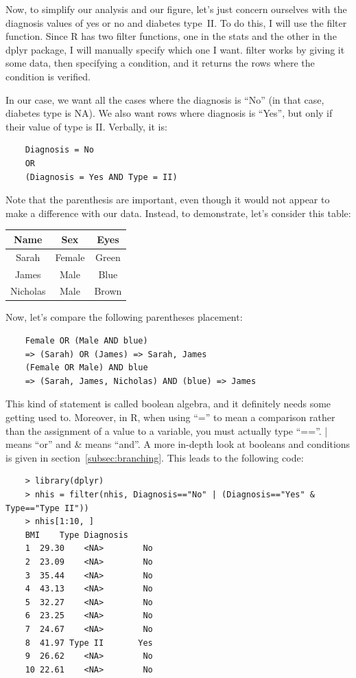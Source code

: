 \documentclass{report}
\newcommand{\code}[1]{\textsf{\ttfamily #1}}
\begin{document}
	Now, to simplify our analysis and our figure, let's just concern ourselves with the diagnosis values of yes or no and diabetes type~II. To do this, I will use the \code{filter} function. Since R has two \code{filter} functions, one in the \code{stats} and the other in the \code{dplyr} package, I will manually specify which one I want. \code{filter} works by giving it some data, then specifying a condition, and it returns the rows where the condition is verified.
	
	In our case, we want all the cases where the diagnosis is ``No'' (in that case, diabetes type is NA). We also want rows where diagnosis is ``Yes'', but only if their value of type is II. Verbally, it is:
	
	\begin{verbatim}
	Diagnosis = No 
	OR 
	(Diagnosis = Yes AND Type = II)
	\end{verbatim}
	
	Note that the parenthesis are important, even though it would not appear to make a difference with our data. Instead, to demonstrate, let's consider this table:
	
	\begin{tabular}{|c|c|c|}
		\hline
		Name & Sex & Eyes \\
		\hline
		Sarah & Female & Green \\
		James & Male & Blue \\
		Nicholas & Male & Brown \\
		\hline
	\end{tabular}
	
	Now, let's compare the following parentheses placement:
	\begin{verbatim}
	Female OR (Male AND blue)
	=> (Sarah) OR (James) => Sarah, James
	(Female OR Male) AND blue
	=> (Sarah, James, Nicholas) AND (blue) => James
	\end{verbatim}
	
	This kind of statement is called boolean algebra, and it definitely needs some getting used to. Moreover, in R, when using ``='' to mean a comparison rather than the assignment of a value to a variable, you must actually type ``==''. \code{|} means ``or'' and \code{\&} means ``and''. A more in-depth look at booleans and conditions is given in section~\ref{subsec:branching}. This leads to the following code:
	
	\begin{verbatim}
	> library(dplyr)
	> nhis = filter(nhis, Diagnosis=="No" | (Diagnosis=="Yes" & Type=="Type II"))
	> nhis[1:10, ]
	BMI    Type Diagnosis
	1  29.30    <NA>        No
	2  23.09    <NA>        No
	3  35.44    <NA>        No
	4  43.13    <NA>        No
	5  32.27    <NA>        No
	6  23.25    <NA>        No
	7  24.67    <NA>        No
	8  41.97 Type II       Yes
	9  26.62    <NA>        No
	10 22.61    <NA>        No
	\end{verbatim}
	
\end{document}
